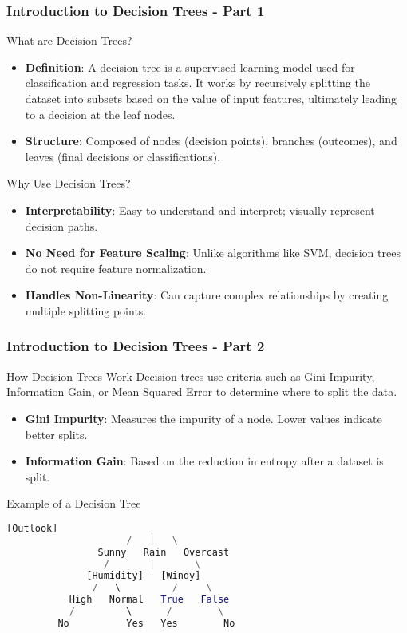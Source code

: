 \documentclass[aspectratio=169]{beamer}
\begin{document}
\begin{frame}[fragile]
    \frametitle{Introduction to Decision Trees - Part 1}
    \begin{block}{What are Decision Trees?}
        \begin{itemize}
            \item \textbf{Definition}: A decision tree is a supervised learning model used for classification and regression tasks. It works by recursively splitting the dataset into subsets based on the value of input features, ultimately leading to a decision at the leaf nodes.
            \item \textbf{Structure}: Composed of nodes (decision points), branches (outcomes), and leaves (final decisions or classifications).
        \end{itemize}
    \end{block}
    
    \begin{block}{Why Use Decision Trees?}
        \begin{itemize}
            \item \textbf{Interpretability}: Easy to understand and interpret; visually represent decision paths.
            \item \textbf{No Need for Feature Scaling}: Unlike algorithms like SVM, decision trees do not require feature normalization.
            \item \textbf{Handles Non-Linearity}: Can capture complex relationships by creating multiple splitting points.
        \end{itemize}
    \end{block}
\end{frame}

\begin{frame}[fragile]
    \frametitle{Introduction to Decision Trees - Part 2}
    \begin{block}{How Decision Trees Work}
        Decision trees use criteria such as Gini Impurity, Information Gain, or Mean Squared Error to determine where to split the data.
        \begin{itemize}
            \item \textbf{Gini Impurity}: Measures the impurity of a node. Lower values indicate better splits.
            \item \textbf{Information Gain}: Based on the reduction in entropy after a dataset is split.
        \end{itemize}
    \end{block}

    \begin{block}{Example of a Decision Tree}
        \begin{lstlisting}[language=Python]
                     [Outlook]
                     /   |   \
                Sunny   Rain   Overcast
                 /       |       \
              [Humidity]   [Windy] 
               /   \         /     \
           High   Normal   True   False
           /         \      /        \
         No          Yes   Yes        No
        \end{lstlisting}
    \end{block}
\end{frame}
\end{document}
